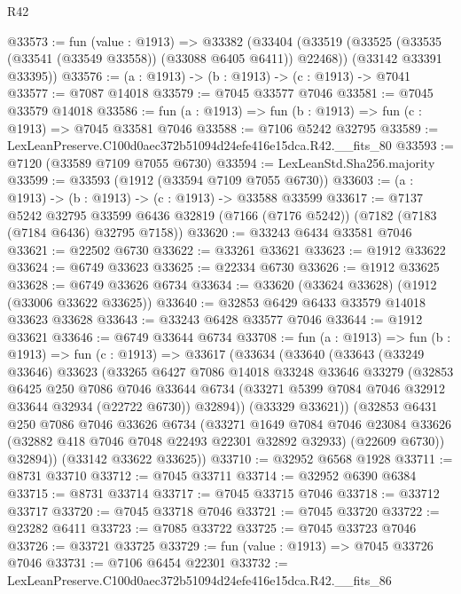 \begin{lexlean}{R42}
\begin{coremodule}
{@33573 := fun (value : @1913) =>
  @33382
    (@33404
      (@33519 (@33525 (@33535 (@33541 (@33549 @33558)) (@33088 @6405 @6411)) @22468))
      (@33142 @33391 @33395))
@33576 := (a : @1913) -> (b : @1913) -> (c : @1913) -> @7041
@33577 := @7087 @14018
@33579 := @7045 @33577 @7046
@33581 := @7045 @33579 @14018
@33586 := fun (a : @1913) => fun (b : @1913) => fun (c : @1913) => @7045 @33581 @7046
@33588 := @7106 @5242 @32795
@33589 := LexLeanPreserve.C100d0aec372b51094d24efe416e15dca.R42.__fits_80
@33593 := @7120 (@33589 @7109 @7055 @6730)
@33594 := LexLeanStd.Sha256.majority
@33599 := @33593 (@1912 (@33594 @7109 @7055 @6730))
@33603 := (a : @1913) -> (b : @1913) -> (c : @1913) -> @33588 @33599
@33617 := @7137
    @5242
    @32795
    @33599
    @6436
    @32819
    (@7166 (@7176 @5242))
    (@7182 (@7183 (@7184 @6436) @32795 @7158))
@33620 := @33243 @6434 @33581 @7046
@33621 := @22502 @6730
@33622 := @33261 @33621
@33623 := @1912 @33622
@33624 := @6749 @33623
@33625 := @22334 @6730
@33626 := @1912 @33625
@33628 := @6749 @33626 @6734
@33634 := @33620 (@33624 @33628) (@1912 (@33006 @33622 @33625))
@33640 := @32853 @6429 @6433 @33579 @14018 @33623 @33628
@33643 := @33243 @6428 @33577 @7046
@33644 := @1912 @33621
@33646 := @6749 @33644 @6734
@33708 := fun (a : @1913) =>
  fun (b : @1913) =>
  fun (c : @1913) =>
  @33617
    (@33634
      (@33640
        (@33643
          (@33249 @33646)
          @33623
          (@33265
            @6427
            @7086
            @14018
            @33248
            @33646
            @33279
            (@32853
              @6425
              @250
              @7086
              @7046
              @33644
              @6734
              (@33271 @5399 @7084 @7046 @32912 @33644 @32934 (@22722 @6730))
              @32894))
          (@33329 @33621))
        (@32853
          @6431
          @250
          @7086
          @7046
          @33626
          @6734
          (@33271
            @1649
            @7084
            @7046
            @23084
            @33626
            (@32882 @418 @7046 @7048 @22493 @22301 @32892 @32933)
            (@22609 @6730))
          @32894))
      (@33142 @33622 @33625))
@33710 := @32952 @6568 @1928
@33711 := @8731 @33710
@33712 := @7045 @33711
@33714 := @32952 @6390 @6384
@33715 := @8731 @33714
@33717 := @7045 @33715 @7046
@33718 := @33712 @33717
@33720 := @7045 @33718 @7046
@33721 := @7045 @33720
@33722 := @23282 @6411
@33723 := @7085 @33722
@33725 := @7045 @33723 @7046
@33726 := @33721 @33725
@33729 := fun (value : @1913) => @7045 @33726 @7046
@33731 := @7106 @6454 @22301
@33732 := LexLeanPreserve.C100d0aec372b51094d24efe416e15dca.R42.__fits_86
}
\end{coremodule}
\end{lexlean}
